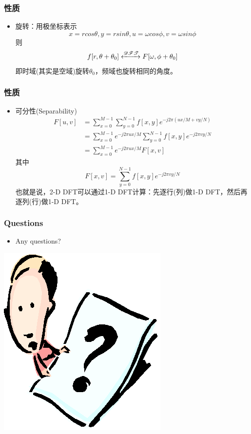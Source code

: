 \documentclass[CJKutf8,xcolor=pdftex,dvipsnames,table]{beamer}
\begin{document}
\begin{CJK*}{UTF8}{song}
  \begin{frame}
    \frametitle{性质}
    \begin{itemize}
    \item 旋转：用极坐标表示    
    \[
    	x=rcos\theta, y=rsin\theta, u = \omega cos\phi, v=\omega sin \phi
    \]
    则
    \[
    	f[r, \theta+\theta_0] \xleftrightarrow{\mathscr{DFT}} F[\omega, \phi+\theta_0]
    \]
    即时域(其实是空域)旋转$\theta_0$，频域也旋转相同的角度。
    \end{itemize}
  \end{frame}  
  
  \begin{frame}
    \frametitle{性质}
    \begin{itemize}
    \item 可分性(Separability)    
    \begin{align*}
    	F[u, v] & = \sum_{x=0}^{M-1} \sum_{y=0}^{N-1} f[x, y] e^{-j2\pi (ux/M+vy/N)} \\
	            & = \sum_{x=0}^{M-1} e^{-j2\pi ux/M} \sum_{y=0}^{N-1} f[x, y] e^{-j2\pi vy/N} \\
	            & = \sum_{x=0}^{M-1} e^{-j2\pi ux/M} F[x, v]
    \end{align*}
    其中
    \[
	    F[x, v] = \sum_{y=0}^{N-1} f[x, y] e^{-j2\pi vy/N}
    \]
    也就是说，{\color{red}2-D DFT可以通过1-D DFT计算：先逐行(列)做1-D DFT，然后再逐列(行)做1-D DFT}。    
    \end{itemize}
  \end{frame}  
    
  \begin{frame}
    \frametitle{Questions}
    \begin{itemize}
    \item Any questions?
    \end{itemize}
    \begin{center}
      \includegraphics[scale=.5]{question}
    \end{center}
  \end{frame}  
  
\end{CJK*}
\end{document}
